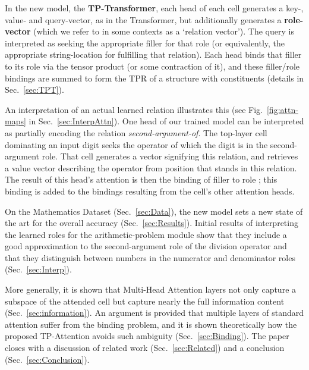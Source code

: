 \documentclass[11pt,a4paper]{article}
\newcommand{\newterm}[1]{{\bf #1}}
\begin{document}
In the new model, the \newterm{TP-Transformer}, each head of each cell generates a key-, value- and query-vector, as in the Transformer, but additionally generates a \newterm{role-vector} (which we refer to in some contexts as a `relation vector').
The query is interpreted as seeking the appropriate filler for that role (or equivalently, the appropriate string-location for fulfilling that relation).
Each head binds that filler to its role via the tensor product (or some contraction of it), and these filler/role bindings are summed to form the TPR of a structure with  constituents (details in Sec.~\ref{sec:TPT}). 

An interpretation of an actual learned relation illustrates this (see Fig.~\ref{fig:attn-maps} in Sec.~\ref{sec:InterpAttn}).
One head of our trained model can be interpreted as partially encoding the relation \textit{second-argument-of}.
The top-layer cell dominating an input digit seeks the operator of which the digit is in the second-argument role.
That cell generates a vector  signifying this relation, and retrieves a value vector  describing the operator from position  that stands in this relation.
The result of this head's attention is then the binding of filler  to role ; this binding is added to the bindings resulting from the cell's other attention heads. 

On the Mathematics Dataset (Sec.~\ref{sec:Data}), the new model sets a new state of the art for the overall accuracy (Sec.~\ref{sec:Results}).
Initial results of interpreting the learned roles for the arithmetic-problem module show that they include a good approximation to the second-argument role of the division operator and that they distinguish between numbers in the numerator and denominator roles (Sec.~\ref{sec:Interp}). 

More generally, it is shown that Multi-Head Attention layers not only capture a subspace of the attended cell but capture nearly the full information content (Sec.~\ref{sec:information}).
An argument is provided that multiple layers of standard attention suffer from the binding problem, and it is shown theoretically how the proposed TP-Attention avoids such ambiguity (Sec.~\ref{sec:Binding}).
The paper closes with a discussion of related work (Sec.~\ref{sec:Related}) and a conclusion (Sec.~\ref{sec:Conclusion}).
\end{document}
